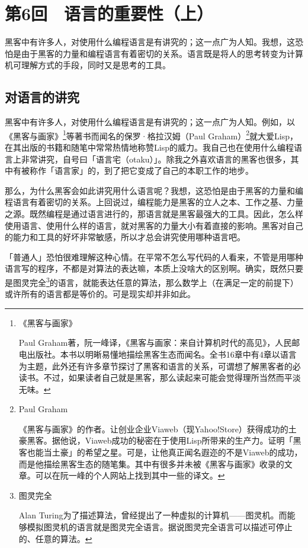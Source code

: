 \documentclass[a4paper,12pt]{article}
\begin{document}

\section{第6回　语言的重要性（上）}

黑客中有许多人，对使用什么编程语言是有讲究的；这一点广为人知。我想，这恐怕是由于黑客的力量和编程语言有着密切的关系。语言既是将人的思考转变为计算机可理解方式的手段，同时又是思考的工具。

\subsection{对语言的讲究}

黑客中有许多人，对使用什么编程语言是有讲究的；这一点广为人知。例如，以《黑客与画家》\footnote{《黑客与画家》

Paul Graham著，阮一峰译，《黑客与画家：来自计算机时代的高见》，人民邮电出版社。本书以明晰易懂地描绘黑客生态而闻名。全书16章中有4章以语言为主题，此外还有许多章节探讨了黑客和语言的关系，可谓想了解黑客者的必读书。不过，如果读者自己就是黑客，那么读起来可能会觉得理所当然而平淡无味。}等著书而闻名的保罗·格拉汉姆（Paul Graham）\footnote{Paul Graham

《黑客与画家》的作者。让创业企业Viaweb（现Yahoo!Store）获得成功的土豪黑客。据他说，Viaweb成功的秘密在于使用Lisp所带来的生产力。证明「黑客也能当土豪」的希望之星。可是，让他真正闻名遐迩的不是Viaweb的成功，而是他描绘黑客生态的随笔集。其中有很多并未被《黑客与画家》收录的文章。可以在阮一峰的个人网站上找到其中一些的译文。}就大爱Lisp，在其出版的书籍和随笔中常常热情地称赞Lisp的威力。我自己也在使用什么编程语言上非常讲究，自号曰「语言宅（otaku）」。除我之外喜欢语言的黑客也很多，其中有被称作「语言家」的，到了把它变成了自己的本职工作的地步。

那么，为什么黑客会如此讲究用什么语言呢？我想，这恐怕是由于黑客的力量和编程语言有着密切的关系。上回说过，编程能力是黑客的立人之本、工作之基、力量之源。既然编程是通过语言进行的，那语言就是黑客最强大的工具。因此，怎么样使用语言、使用什么样的语言，就对黑客的力量大小有着直接的影响。黑客对自己的能力和工具的好坏非常敏感，所以才总会讲究使用哪种语言吧。

「普通人」恐怕很难理解这种心情。在平常不怎么写代码的人看来，不管是用哪种语言写的程序，不都是对算法的表达嘛，本质上没啥大的区别啊。确实，既然只要是图灵完全\footnote{图灵完全

Alan Turing为了描述算法，曾经提出了一种虚拟的计算机——图灵机。而能够模拟图灵机的语言就是图灵完全语言。据说图灵完全语言可以描述可停止的、任意的算法。}的语言，就能表达任意的算法，那么数学上（在满足一定的前提下）或许所有的语言都是等价的。可是现实却并非如此。
\end{document}
